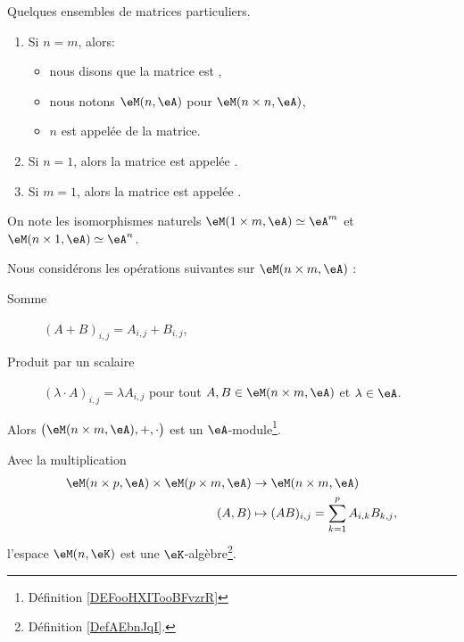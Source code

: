 \begin{definition}
	Quelques ensembles de matrices particuliers.
	\begin{enumerate}
		\item Si \( n=m\), alors:
		      \begin{itemize}
			      \item nous disons que la matrice est ,
			      \item nous notons \( \eM(n,\eA)\) pour \( \eM(n\times n,\eA)\),
			      \item \( n \) est appelée  de la matrice.
		      \end{itemize}
		\item Si \( n = 1 \), alors la matrice est appelée .
		\item Si \( m = 1 \), alors la matrice est appelée .
	\end{enumerate}
\end{definition}

\begin{normaltext}
	On note les isomorphismes naturels \( \eM(1\times m,\eA) \simeq \eA^m\) et \( \eM(n\times 1,\eA) \simeq \eA^n\).
\end{normaltext}

\begin{lemmaDef}        \label{LEMooYWTEooQyLxKv}
	Nous considérons les opérations suivantes sur \( \eM(n\times m, \eA)\) :
	\begin{description}
		\item[Somme] \( (A+B)_{i,j}=A_{i,j}+B_{i,j}\),
		\item[Produit par un scalaire] \( (\lambda \cdot A)_{i,j}=\lambda A_{i,j}\) pour tout \( A,B\in \eM(n\times m,\eA ) \) et \( \lambda\in \eA \).
	\end{description}
	Alors \( \big( \eM(n\times m, \eA), +,\cdot \big)\) est un \( \eA\)-module\footnote{Définition \ref{DEFooHXITooBFvzrR}}.
\end{lemmaDef}

\begin{lemmaDef}        \label{LEMooMBZTooKdGvON}
	Avec la multiplication
	\begin{equation}
		\begin{aligned}
			\eM(n\times p,\eA)\times \eM(p\times m,\eA) & \to \eM(n\times m,\eA)                      \\
			(A,B)                                       & \mapsto (AB)_{i,j}=\sum_{k=1}^pA_{i,k}B_{k,j},
		\end{aligned}
	\end{equation}
	l'espace \( \eM(n,\eK)\) est une \( \eK\)-algèbre\footnote{Définition \ref{DefAEbnJqI}.}.
\end{lemmaDef}

